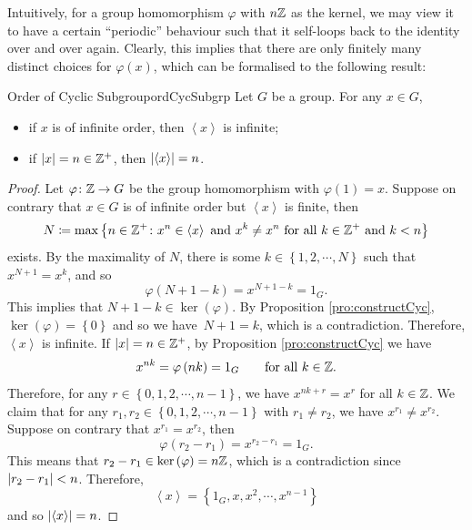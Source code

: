 \documentclass[math]{amznotes}
\theoremstyle{remark}
\newcommand{\cyclic}[1]{\left\langle#1\right\rangle}
\newcommand{\kernel}[1]{\ker\left(#1\right)}
\newcommand{\0}{\mathbf{0}}
\newcommand{\1}{\mathbf{1}}
\begin{document}
Intuitively, for a group homomorphism $\varphi$ with $n\mathbb{Z}$ as the kernel, we may view it to have a certain ``periodic'' behaviour such that it self-loops back to the identity over and over again. Clearly, this implies that there are only finitely many distinct choices for $\varphi\left(x\right)$, which can be formalised to the following result:
\begin{corbox}{Order of Cyclic Subgroup}{ordCycSubgrp}
    Let $G$ be a group. For any $x \in G$,
    \begin{itemize}
        \item if $x$ is of infinite order, then $\left\langle x \right\rangle$ is infinite;
        \item if ${\left\lvert {x} \right\rvert} = n \in \mathbb{Z}^+$, then ${\left\lvert {\left\langle x \right\rangle} \right\rvert} = n$.
    \end{itemize}
    \tcblower
    \begin{proof}
        Let $\varphi \colon \mathbb{Z} \to G$ be the group homomorphism with $\varphi\left(1\right) = x$. Suppose on contrary that $x \in G$ is of infinite order but $\cyclic{x}$ is finite, then 
        \begin{equation*}
            N \coloneqq \max\left\{n \in \Z^+ \colon x^n \in \cyclic{x} \textrm{ and } x^k \neq x^n \textrm{ for all } k \in \Z^+ \textrm{ and } k < n\right\}
        \end{equation*}
        exists. By the maximality of $N$, there is some $k \in \left\{1, 2, \cdots, N\right\}$ such that $x^{N + 1} = x^k$, and so
        \begin{equation*}
            \varphi\left(N + 1 - k\right) = x^{N + 1 - k} = 1_G.  
        \end{equation*}
        This implies that $N + 1 - k \in \kernel{\varphi}$. By Proposition \ref{pro:constructCyc}, $\kernel{\varphi} = \left\{0\right\}$ and so we have~$N + 1 = k$, which is a contradiction. Therefore, $\cyclic{x}$ is infinite. If ${\left\lvert {x} \right\rvert} = n \in \mathbb{Z}^+$, by Proposition \ref{pro:constructCyc} we have 
        \begin{equation*}
            x^{nk} = \varphi\left(nk\right) = 1_G \qquad\textrm{for all } k \in \mathbb{Z}.
        \end{equation*}
        Therefore, for any $r \in \left\{0, 1, 2, \cdots, n - 1\right\}$, we have $x^{nk + r} = x^{r}$ for all $k \in \mathbb{Z}$. We claim that for any $r_1, r_2 \in \left\{0, 1, 2, \cdots, n - 1\right\}$ with $r_1 \neq r_2$, we have $x^{r_1} \neq x^{r_2}$. Suppose on contrary that $x^{r_1} = x^{r_2}$, then 
        \begin{equation*}
            \varphi\left(r_2 - r_1\right) = x^{r_2 - r_1} = 1_G.
        \end{equation*}
        This means that $r_2 - r_1 \in \kernel{\varphi} = n\Z$, which is a contradiction since ${\left\lvert {r_2 - r_1} \right\rvert} < n$. Therefore, \begin{equation*}
            \cyclic{x} = \left\{1_G, x, x^2, \cdots, x^{n - 1}\right\}
        \end{equation*}
        and so $\abs{\cyclic{x}} = n$.
    \end{proof}
\end{corbox}
\end{document}
